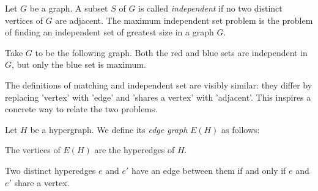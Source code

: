 
\begin{definition}
    Let $G$ be a graph. A subset $S$ of $G$ is called \textit{independent} if no two distinct vertices of $G$ are adjacent. The maximum independent set problem is the problem of finding an independent set of greatest size in a graph $G$.
\end{definition}

\begin{example}
    Take $G$ to be the following graph. Both the red and blue sets are independent in $G$, but only the blue set is maximum.
    
    \begin{center}
\end{center}
\end{example}

The definitions of matching and independent set are visibly similar: they differ by replacing 'vertex' with 'edge' and 'shares a vertex' with 'adjacent'. This inspires a concrete way to relate the two problems.

\begin{construction}\label{edgegraph}
    Let $H$ be a hypergraph. We define its \textit{edge graph} $E(H)$ as follows:

    The vertices of $E(H)$ are the hyperedges of $H$.

    Two distinct hyperedges $e$ and $e'$ have an edge between them if and only if $e$ and $e'$ share a vertex.
\end{construction}

